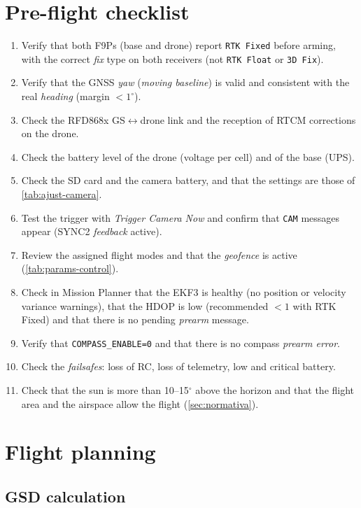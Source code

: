 \section{Pre-flight checklist}
\label{sec:checklist-prevol}

\begin{enumerate}[label=\arabic*.]
    \item Verify that both F9Ps (base and drone) report \texttt{RTK Fixed} before arming, with the correct \emph{fix} type on both receivers (not \texttt{RTK Float} or \texttt{3D Fix}).
    \item Verify that the GNSS \emph{yaw} (\emph{moving baseline}) is valid and consistent with the real \emph{heading} (margin $< 1^{\circ}$).
    \item Check the RFD868x GS$\leftrightarrow$drone link and the reception of RTCM corrections on the drone.
    \item Check the battery level of the drone (voltage per cell) and of the base (UPS).
    \item Check the SD card and the camera battery, and that the settings are those of \cref{tab:ajust-camera}.
    \item Test the trigger with \emph{Trigger Camera Now} and confirm that \texttt{CAM} messages appear (SYNC2 \emph{feedback} active).
    \item Review the assigned flight modes and that the \emph{geofence} is active (\cref{tab:params-control}).
    \item Check in Mission Planner that the EKF3 is healthy (no position or velocity variance warnings), that the HDOP is low (recommended $< 1$ with RTK Fixed) and that there is no pending \emph{prearm} message.
    \item Verify that \texttt{COMPASS\_ENABLE=0} and that there is no compass \emph{prearm error}.
    \item Check the \emph{failsafes}: loss of RC, loss of telemetry, low and critical battery.
    \item Check that the sun is more than 10--15$^{\circ}$ above the horizon and that the flight area and the airspace allow the flight (\cref{sec:normativa}).
\end{enumerate}

\section{Flight planning}
\label{sec:planificacio-vol}

\subsection{GSD calculation}

